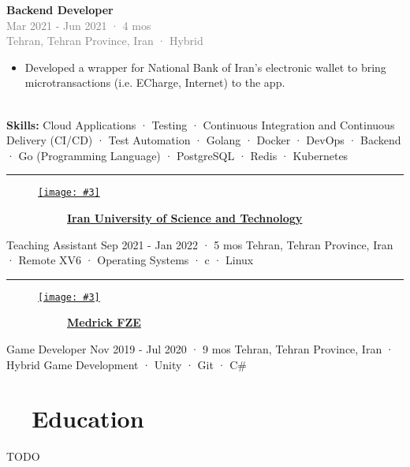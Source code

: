 \documentclass[a4paper,20pt]{article}
\makeatletter
\newcommand{\resumeSubheading}[4]{
  \vspace{-1pt}\item
    \begin{tabular*}{0.97\textwidth}{l@{\extracolsep{\fill}}r}
      \textbf{#1} & #2 \\
      \textit{#3} & \textit{#4} \\
    \end{tabular*}\vspace{-5pt}
}
\newcommand{\companyHeadingWithImageSimple}[3]{
    \vspace{-24pt}
    \begin{figure}[H]
        \href{#2}{\texttt{[image: \#3]}}
        \vspace{-37.5pt}
    \end{figure}
    ~~~~~~~~~~~\textbf{\href{#2}{#1}}
    \vspace{6pt}
}
\newcommand{\companyHeadingEnd}{
    \vspace{-22pt}
    \begin{center}
        \color{myGray}\par\noindent\rule{.92\textwidth}{0.1pt}
    \end{center}
}
\newcommand{\resumeSubHeadingListStart}{\begin{itemize}[leftmargin=*, label={}]}
\newcommand{\resumeSubHeadingListEnd}{\end{itemize}}
\newcounter{mylist} %
\newenvironment{myitemize}{%
  \stepcounter{mylist}%
  \begin{itemize}
}{\end{itemize}%
  }
\newcommand{\newexperiencewithdesc}[5]{
    \begin{myitem}
        \textbf{#1} \\
        \textcolor{gray}{#2 \\#3\\}
        \vspace{4pt}
        #5 \\
        \vspace{4pt}
        \textbf{Skills: }#4
        \vspace{6pt}   
    \end{myitem}
}
\makeatother
\begin{document}
\begin{myitemize}
        \newexperiencewithdesc
            {Backend Developer}
            {Mar 2021 - Jun 2021 · 4 mos}
            {Tehran, Tehran Province, Iran · Hybrid}
            { Cloud Applications · Testing · Continuous Integration and Continuous Delivery (CI/CD) · Test Automation · Golang · Docker · DevOps · Backend · Go (Programming Language) · PostgreSQL · Redis · Kubernetes}
            {
                \begin{itemize}
                    \item Developed a wrapper for National Bank of Iran's electronic wallet to bring microtransactions (i.e. ECharge, Internet) to the app.
                \end{itemize}
            }
    \end{myitemize}
    \companyHeadingEnd
    \companyHeadingWithImageSimple{Iran University of Science and Technology}{https://www.linkedin.com/company/balemessenger}{iust}
    \vspace{2pt}
    \begin{myitemize}
        \begin{newexperience}                
            {Teaching Assistant}
            {Sep 2021 - Jan 2022 · 5 mos}
            {Tehran, Tehran Province, Iran · Remote}
            {XV6 · Operating Systems · c · Linux}
        \end{newexperience}
    \end{myitemize}
    \companyHeadingEnd
    \companyHeadingWithImageSimple{Medrick FZE}{https://www.linkedin.com/company/medrick-fze/}{medrick}
    \vspace{2pt}
    \begin{myitemize}
        \begin{newexperience}                
            {Game Developer}
            {Nov 2019 - Jul 2020 · 9 mos}
            {Tehran, Tehran Province, Iran · Hybrid}
            {Game Development · Unity · Git · C\#}
        \end{newexperience}
    \end{myitemize}
\vspace{-5pt}
\section{~~Education}
    TODO
	    
\end{document}
